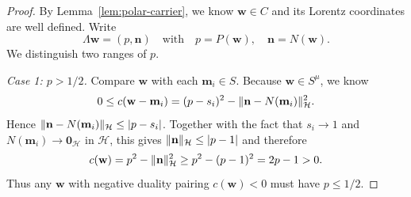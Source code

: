 \documentclass[11pt,a4paper]{article}
\theoremstyle{reportstyle}
\numberwithin{equation}{section}
\newcommand{\HH}{\mathcal H}
\newcommand{\bn}{\mathbf n}
\newcommand{\bm}{\mathbf m}
\newcommand{\bw}{\mathbf w}
\newcommand{\bzero}{\mathbf 0}
\DeclarePairedDelimiter{\norm}{\lVert}{\rVert}
\DeclarePairedDelimiter{\abs}{\lvert}{\rvert}
\begin{document}
	\begin{proof}
		By Lemma~\ref{lem:polar-carrier}, we know $\bw\in C$ and its Lorentz coordinates
		are well defined. Write
		$$ \Lambda \bw =(p,\bn) \quad \mbox{with} \quad p=P(\bw),\quad\bn=N(\bw). $$
		We distinguish two ranges of $p$. \vspace{0.2cm}

		\noindent\emph{Case 1: $p>1/2$.} Compare $\bw$ with each $\bm_i\in S$. Because $\bw\in S^\mu$, we know
		$$ 0\leq c(\bw-\bm_i) = (p-s_i)^2-\norm{\bn-N(\bm_i)}_{\HH}^2. $$
		Hence $\norm{\bn-N(\bm_i)}_{\HH}\le\abs{p-s_i}$. Together with the fact that $s_i\rightarrow1$ and $N(\bm_i)\rightarrow\bzero_{\HH}$ in $\HH$, this gives
		$\norm{\bn}_{\HH}\le\abs{p-1}$ and therefore
		\begin{equation*}
			c(\bw)=p^2-\norm{\bn}_{\HH}^2
			\ge p^2-(p-1)^2=2p-1>0.
		\end{equation*}
		Thus any $\bw$ with negative duality pairing $c(\bw)<0$ must have $p\le 1/2$. \vspace{0.2cm}



\end{proof}
\end{document}
